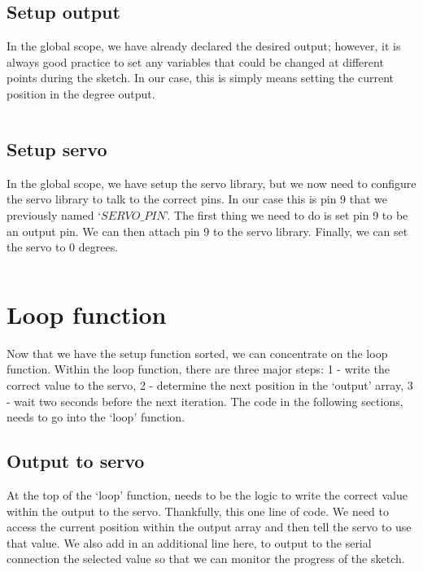 \documentclass[11pt,a4paper]{article}
\begin{document}
\subsection{Setup output}
In the global scope, we have already declared the desired output; however, it is always good practice to set any variables that could be changed at different points during the sketch. In our case, this is simply means setting the current position in the degree output.\\

\vspace{-1.75em}
\inputminted{arduino}{./src/4-setup-output.txt}
\vspace{-.5em}

\subsection{Setup servo}
In the global scope, we have setup the servo library, but we now need to configure the servo library to talk to the correct pins. In our case this is pin 9 that we previously named `$SERVO\_PIN$'. The first thing we need to do is set pin 9 to be an output pin. We can then attach pin 9 to the servo library. Finally, we can set the servo to 0 degrees.\\

\vspace{-1.75em}
\inputminted{arduino}{./src/5-setup-servo.txt}
\vspace{-.5em}

\section{Loop function}
Now that we have the setup function sorted, we can concentrate on the loop function. Within the loop function, there are three major steps: 1 - write the correct value to the servo, 2 - determine the next position in the `output' array, 3 - wait two seconds before the next iteration. The code in the following sections, needs to go into the `loop' function.\\

\subsection{Output to servo}
At the top of the `loop' function, needs to be the logic to write the correct value within the output to the servo. Thankfully, this one line of code. We need to access the current position within the output array and then tell the servo to use that value. We also add in an additional line here, to output to the serial connection the selected value so that we can monitor the progress of the sketch.\\ 
\end{document}
